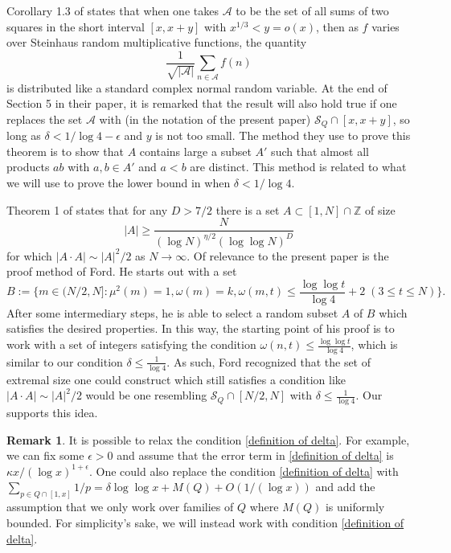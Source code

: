 \documentclass{amsart}
\theoremstyle{definition}
\newtheorem*{remark}{Remark}
\numberwithin{equation}{section}
\renewcommand{\S}{\mathcal{S}}
\newcommand{\density}{\delta}
\newcommand{\mtc}{\eta}
\begin{document}
	Corollary 1.3 of \cite{soundararajan2023central} states that when one takes $\mathcal{A}$ to be the set of all sums of two squares in the short interval $[x,x+y]$ with $x^{1/3}< y = o(x)$, then as $f$ varies over Steinhaus random multiplicative functions, the quantity
	$$\frac{1}{\sqrt{|\mathcal{A}|}}\sum_{n \in \mathcal{A}}f(n)$$
	is distributed like a standard complex normal random variable. At the end of Section 5 in their paper, it is remarked that the result will also hold true if one replaces the set $\mathcal{
	A}$ with (in the notation of the present paper) $\S_Q \cap [x,x+y]$, so long as $\delta < 1/\log 4 -\epsilon$ and $y$ is not too small. The method they use to prove this theorem is to show that $A$ contains large a subset $A'$ such that almost all products $ab$ with $a,b\in A'$ and $a<b$ are distinct. This method is related to what we will use to prove the lower bound in  when $\delta<1/\log 4$.
	
	Theorem 1 of \cite{ford2018extremal} states that for any $D>7/2$ there is a set $A \subset [1, N] \cap \mathbb{Z}$ of size
	$$|A| \geq \frac{N}{(\log N)^{\mtc/2}(\log \log N)^D}$$
	for which $|A \cdot A| \sim |A|^2/2$ as $N \to \infty$. Of relevance to the present paper is the proof method of Ford. He starts out with a set 
	$$B:= \bigg\{m \in (N/2,N]: \mu^2(m) = 1, \omega(m) = k, \omega(m,t) \leq \frac{\log \log t}{\log 4} +2\;(3 \leq t \leq N)\bigg\}.$$
	After some intermediary steps, he is able to select a random subset $A$ of $B$ which satisfies the desired properties. In this way, the starting point of his proof is to work with a set of integers satisfying the condition $\omega(n,t) \leq \frac{\log \log t}{\log 4}$, which is similar to our condition $\delta \leq \frac{1}{\log 4}$. As such, Ford recognized that the set of extremal size one could construct which still satisfies a condition like $|A \cdot A| \sim |A|^2/2$ would be one resembling $\S_Q \cap [N/2,N]$ with $\density \leq \frac{1}{\log 4}$. Our  supports this idea.
	
	\begin{remark}
		It is possible to relax the condition \eqref{definition of delta}. For example, we can fix some $\epsilon > 0$ and assume that the error term in \eqref{definition of delta} is $ \kappa x/(\log x)^{1+\epsilon}$. One could also replace the condition \eqref{definition of delta} with $\sum_{p \in Q \cap [1,x]}1/p = \delta \log\log x +M(Q) + O(1/(\log x))$ and add the assumption that we only work over families of $Q$ where $M(Q)$ is uniformly bounded. For simplicity's sake, we will instead work with condition \eqref{definition of delta}.
	\end{remark}
	
\end{document}
